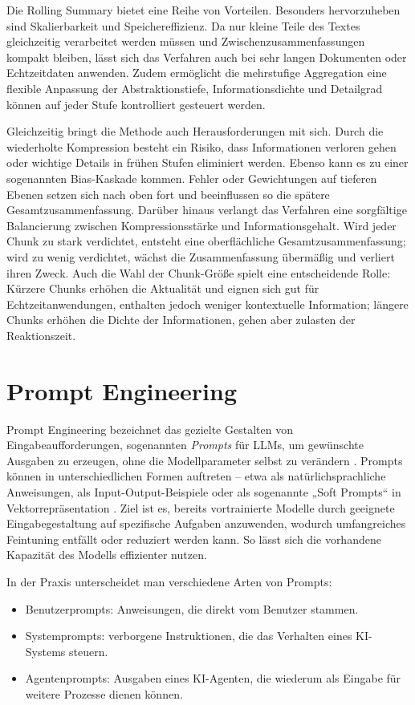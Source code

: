 Die Rolling Summary bietet eine Reihe von Vorteilen. Besonders hervorzuheben sind Skalierbarkeit und Speichereffizienz. Da nur kleine Teile des Textes gleichzeitig verarbeitet werden müssen und Zwischenzusammenfassungen kompakt bleiben, lässt sich das Verfahren auch bei sehr langen Dokumenten oder Echtzeitdaten anwenden. Zudem ermöglicht die mehrstufige Aggregation eine flexible Anpassung der Abstraktionstiefe, Informationsdichte und Detailgrad können auf jeder Stufe kontrolliert gesteuert werden.

Gleichzeitig bringt die Methode auch Herausforderungen mit sich. Durch die wiederholte Kompression besteht ein Risiko, dass Informationen verloren gehen oder wichtige Details in frühen Stufen eliminiert werden. Ebenso kann es zu einer sogenannten Bias-Kaskade kommen. Fehler oder Gewichtungen auf tieferen Ebenen setzen sich nach oben fort und beeinflussen so die spätere Gesamtzusammenfassung. Darüber hinaus verlangt das Verfahren eine sorgfältige Balancierung zwischen Kompressionsstärke und Informationsgehalt. Wird jeder Chunk zu stark verdichtet, entsteht eine oberflächliche Gesamtzusammenfassung; wird zu wenig verdichtet, wächst die Zusammenfassung übermäßig und verliert ihren Zweck. Auch die Wahl der Chunk-Größe spielt eine entscheidende Rolle: Kürzere Chunks erhöhen die Aktualität und eignen sich gut für Echtzeitanwendungen, enthalten jedoch weniger kontextuelle Information; längere Chunks erhöhen die Dichte der Informationen, gehen aber zulasten der Reaktionszeit.

\newpage
\section{Prompt Engineering}
Prompt Engineering bezeichnet das gezielte Gestalten von Eingabeaufforderungen, sogenannten \textit{Prompts} für LLMs, um gewünschte Ausgaben zu erzeugen, ohne die Modellparameter selbst zu verändern \cite{Sahoo2024}. Prompts können in unterschiedlichen Formen auftreten – etwa als natürlichsprachliche Anweisungen, als Input-Output-Beispiele oder als sogenannte „Soft Prompts“ in Vektor­repräsentation \cite{Chen2023}. Ziel ist es, bereits vortrainierte Modelle durch geeignete Eingabe­gestaltung auf spezifische Aufgaben anzuwenden, wodurch umfangreiches Feintuning entfällt oder reduziert werden kann. So lässt sich die vorhandene Kapazität des Modells effizienter nutzen.

In der Praxis unterscheidet man verschiedene Arten von Prompts:
\begin{itemize}
    \item Benutzerprompts: Anweisungen, die direkt vom Benutzer stammen.
    \item Systemprompts: verborgene Instruktionen, die das Verhalten eines KI-Systems steuern.
    \item Agentenprompts: Ausgaben eines KI-Agenten, die wiederum als Eingabe für weitere Prozesse dienen können.
\end{itemize}

